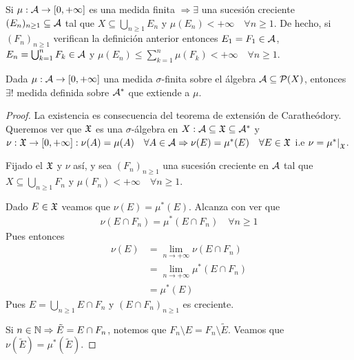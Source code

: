 \begin{note}
    Si \(\mu : \mathcal{A} \to [0, +\infty]\) es una medida finita \(\Rightarrow \exists\) una sucesión creciente \((E_n)_{n \geq 1} \subseteq \mathcal{A}\) tal que \(X \subseteq \bigcup_{n \geq 1} E_n\)
    y \(\mu(E_n) < +\infty \quad \forall n \geq 1\). De hecho, si \((F_n)_{n \geq 1}\) verifican la definición anterior entonces \(E_1 = F_1 \in \mathcal{A}\),
    \(E_n = \bigcup_{k = 1}^n F_k \in \mathcal{A}\) y \(\mu(E_n) \leq \sum_{k = 1}^n \mu(F_k) < +\infty \quad \forall n \geq 1\).
\end{note}

\begin{theorem}
    Dada \(\mu : \mathcal{A} \to [0, +\infty]\) una medida \(\sigma\)-finita sobre el álgebra \(\mathcal{A} \subseteq \mathcal{P}(X)\), entonces \(\exists!\) medida definida sobre \(\mathcal{A}^*\) que extiende a \(\mu\).

    \begin{proof}
        La existencia es consecuencia del teorema de extensión de Caratheódory. Queremos ver que \(\mathfrak{X}\) es una \(\sigma\)-álgebra en \(X : \mathcal{A} \subseteq \mathfrak{X} \subseteq \mathcal{A}^*\)
        y \(\nu : \mathfrak{X} \to [0, +\infty] : \nu(A) = \mu(A) \quad \forall A \in \mathcal{A} \Rightarrow \nu(E) = \mu^*(E) \quad \forall E \in \mathfrak{X}\) i.e \(\nu = \restr{\mu^*}{\mf{X}}\).

        Fijado el \(\mathfrak{X}\) y \(\nu\) así, y sea \((F_n)_{n \geq 1} \) una sucesión creciente en \(\mathcal{A}\) tal que \(X \subseteq \bigcup_{n \geq 1} F_n\) y \(\mu(F_n) < +\infty \quad \forall n \geq 1\).

        Dado \(E \in \mathfrak{X}\) veamos que \(\nu(E) = \mu^*(E)\). Alcanza con ver que \begin{align*}
            \nu(E \cap F_n) = \mu^*(E \cap F_n) \quad \forall n \geq 1
        \end{align*}
        Pues entonces \begin{align*}
            \nu(E) & = \lim_{n \to +\infty} \nu(E \cap F_n)   \\
                   & = \lim_{n \to +\infty} \mu^*(E \cap F_n) \\
                   & = \mu^*(E)
        \end{align*}
        Pues \(E = \bigcup_{n \geq 1} E \cap F_n\) y \((E \cap F_n)_{n \geq 1}\) es creciente.

        Si \(n \in \mathbb{N} \Rightarrow \tilde{E} = E \cap F_n\), notemos que \(F_n \setminus E = F_n \setminus \tilde{E}\). Veamos que \(\nu(\tilde{E}) = \mu^*(\tilde{E})\).


\end{proof}
\end{theorem}
